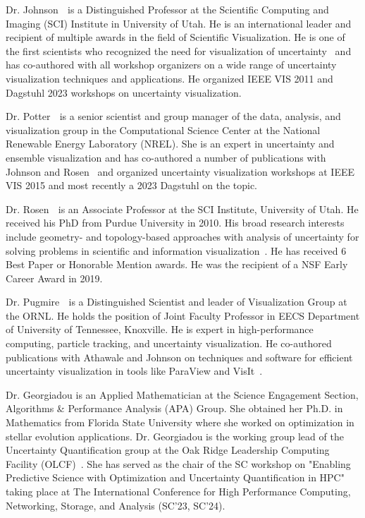 {\large Dr. Johnson} $\;$ is a Distinguished Professor at the Scientific Computing and Imaging (SCI) Institute in University of Utah. He is an international leader and recipient of multiple awards in the field of Scientific Visualization. He is one of the first scientists who recognized the need for visualization of uncertainty~\cite{TA:Johnson:2003:nextStepVisErrors, TA:2004:Johnson:topScivis} and has co-authored with all workshop organizers on a wide range of uncertainty visualization techniques and applications. He organized IEEE VIS 2011 and Dagstuhl 2023 workshops on uncertainty visualization.

{\large Dr. Potter} $\;$ is a senior scientist and group manager of the data, analysis, and visualization group in the Computational Science Center at the National Renewable Energy Laboratory (NREL). She is an expert in uncertainty and ensemble visualization and has co-authored a number of publications with Johnson and Rosen~\cite{TA:Potter:2009:ensemble-vis, TA:Potter:2012:UQtaxonomy, muView} and organized uncertainty visualization workshops at IEEE VIS 2015 and most recently a 2023 Dagstuhl on the topic. 

{\large Dr. Rosen} $\;$ is an Associate Professor at the SCI Institute, University of Utah. He received his PhD from Purdue University in 2010. 
His broad research interests include geometry- and topology-based approaches with analysis of uncertainty for solving problems in scientific and information visualization~\cite{TA:Potter:2012:UQtaxonomy, muView}. He has received 6 Best Paper or Honorable Mention awards. He was the recipient of a NSF Early Career Award in 2019.

{\large Dr. Pugmire} $\;$ is a Distinguished Scientist and leader of Visualization Group at the ORNL. He holds the position of Joint Faculty Professor in EECS Department of University of Tennessee, Knoxville. He is expert in high-performance computing, particle tracking, and uncertainty visualization. He co-authored publications with Athawale and Johnson on techniques and software for efficient uncertainty visualization in tools like ParaView and VisIt~\cite{TA:2023:Wang:funmc2, TA:Athawale:2023:uncertainFibers}. 

Dr. Georgiadou is an Applied Mathematician at the Science Engagement Section, Algorithms \& Performance Analysis (APA) Group. She obtained her Ph.D. in Mathematics from Florida State University where she worked on optimization in stellar evolution applications. Dr. Georgiadou is the working group lead of the Uncertainty Quantification group at the Oak Ridge Leadership Computing Facility (OLCF)~\cite{ensLead}. She has served as the chair of the SC workshop on "Enabling Predictive Science with Optimization and Uncertainty Quantification in HPC" taking place at The International Conference for High Performance Computing, Networking, Storage, and Analysis (SC'23, SC'24).

